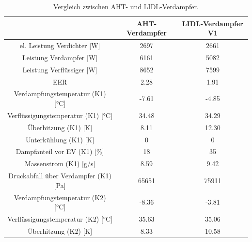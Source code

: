 \begin{table}[h!]
\centering
\caption{Vergleich zwischen AHT- und LIDL-Verdampfer.}
\label{tab:Vergleichaltneu}
\begin{tabular}{|ccc|}
\hline
                                                                & AHT-Verdampfer      & LIDL-Verdampfer V1 \\ \hline
\multicolumn{1}{|c|}{el. Leistung Verdichter {[}W{]}}           & \multicolumn{1}{c|}{2697}  & 2661                   \\
\multicolumn{1}{|c|}{Leistung Verdampfer {[}W{]}}               & \multicolumn{1}{c|}{6161}  & 5082                   \\
\multicolumn{1}{|c|}{Leistung Verflüssiger {[}W{]}}             & \multicolumn{1}{c|}{8652}  & 7599                   \\
\multicolumn{1}{|c|}{EER}                                       & \multicolumn{1}{c|}{2.28}  & 1.91                   \\ \hline
\multicolumn{1}{|c|}{Verdampfungstemperatur (K1) {[}°C{]}}      & \multicolumn{1}{c|}{-7.61} & -4.85                  \\
\multicolumn{1}{|c|}{Verflüssigungstemperatur (K1) {[}°C{]}}    & \multicolumn{1}{c|}{34.48} & 34.29                  \\
\multicolumn{1}{|c|}{Überhitzung (K1) {[}K{]}}                  & \multicolumn{1}{c|}{8.11}  & 12.30                  \\
\multicolumn{1}{|c|}{Unterkühlung (K1) {[}K{]}}                 & \multicolumn{1}{c|}{0}     & 0                      \\
\multicolumn{1}{|c|}{Dampfanteil vor EV (K1) {[}\%{]}}          & \multicolumn{1}{c|}{18}    & 35                     \\
\multicolumn{1}{|c|}{Massenstrom (K1) {[}g/s{]}}                & \multicolumn{1}{c|}{8.59}  & 9.42                   \\
\multicolumn{1}{|c|}{Druckabfall über Verdampfer (K1) {[}Pa{]}} & \multicolumn{1}{c|}{65651} & 75911                  \\ \hline
\multicolumn{1}{|c|}{Verdampfungstemperatur (K2) {[}°C{]}}      & \multicolumn{1}{c|}{-8.36} & -3.81                  \\
\multicolumn{1}{|c|}{Verflüssigungstemperatur (K2) {[}°C{]}}    & \multicolumn{1}{c|}{35.63} & 35.06                  \\
\multicolumn{1}{|c|}{Überhitzung (K2) {[}K{]}}                  & \multicolumn{1}{c|}{8.33}  & 10.58                  \\

\end{tabular}
\end{table}

